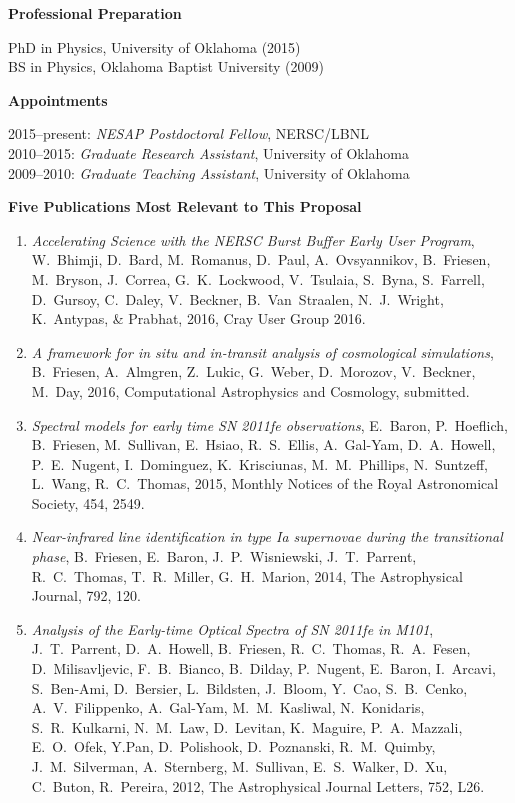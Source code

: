 \documentclass[11pt,letterpaper,english]{article}
\begin{document}
\begin{flushleft} {\bf Professional Preparation}
{\parindent 16pt

PhD in Physics, University of Oklahoma (2015)\\ 
BS in Physics, Oklahoma Baptist University (2009)\\ 
}

\vspace{.04in}
{\bf Appointments}
{\parindent 16pt

2015--present: {\em NESAP Postdoctoral Fellow}, NERSC/LBNL \\ 
2010--2015: {\em Graduate Research Assistant}, University of Oklahoma \\
2009--2010: {\em Graduate Teaching Assistant}, University of Oklahoma
}

\vspace{.04in}
{\bf Five Publications Most Relevant to This Proposal}
\vspace{-6pt}
\begin{enumerate} \itemsep1pt \parskip0pt 

\item {\it Accelerating Science with the NERSC Burst Buffer Early User Program},
W.~Bhimji, D.~Bard, M.~Romanus, D.~Paul, A.~Ovsyannikov, B.~Friesen, M.~Bryson,
J.~Correa, G.~K.~Lockwood, V.~Tsulaia, S.~Byna, S.~Farrell, D.~Gursoy,
C.~Daley, V.~Beckner, B.~Van~Straalen, N.~J.~Wright, K.~Antypas, \& Prabhat,
2016, Cray User Group 2016.

\item {\it A framework for \textit{in situ} and in-transit analysis of
cosmological simulations}, B.~Friesen, A.~Almgren, Z.~Lukic, G.~Weber,
D.~Morozov, V.~Beckner, M.~Day, 2016, Computational Astrophysics and Cosmology,
submitted.

\item {\it Spectral models for early time SN 2011fe observations}, E.~Baron,
P.~Hoeflich, B.~Friesen, M.~Sullivan, E.~Hsiao, R.~S.~Ellis, A.~Gal-Yam,
D.~A.~Howell, P.~E.~Nugent, I.~Dominguez, K.~Krisciunas, M.~M.~Phillips,
N.~Suntzeff, L.~Wang, R.~C.~Thomas, 2015, Monthly Notices of the Royal
Astronomical Society, 454, 2549.

\item {\it Near-infrared line identification in type Ia supernovae during the
transitional phase}, B.~Friesen, E.~Baron, J.~P.~Wisniewski, J.~T.~Parrent,
R.~C.~Thomas, T.~R.~Miller, G.~H.~Marion, 2014, The Astrophysical Journal, 792,
120.

\item {\it Analysis of the Early-time Optical Spectra of SN 2011fe in M101},
J.~T.~Parrent, D.~A.~Howell, B.~Friesen, R.~C.~Thomas, R.~A.~Fesen,
D.~Milisavljevic, F.~B.~Bianco, B.~Dilday, P.~Nugent, E.~Baron, I.~Arcavi,
S.~Ben-Ami, D.~Bersier, L.~Bildsten, J.~Bloom, Y.~Cao, S.~B.~Cenko,
A.~V.~Filippenko, A.~Gal-Yam, M.~M.~Kasliwal, N.~Konidaris, S.~R.~Kulkarni,
N.~M.~Law, D.~Levitan, K.~Maguire, P.~A.~Mazzali, E.~O.~Ofek, Y.Pan,
D.~Polishook, D.~Poznanski, R.~M.~Quimby, J.~M.~Silverman, A.~Sternberg,
M.~Sullivan, E.~S.~Walker, D.~Xu, C.~Buton, R.~Pereira, 2012, The Astrophysical
Journal Letters, 752, L26.


\end{enumerate}
\end{flushleft}
\end{document}

